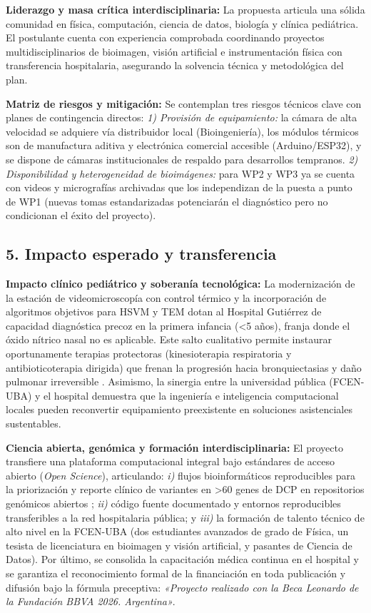 \documentclass[11pt,letterpaper]{article}
\begin{document}
\textbf{Liderazgo y masa crítica interdisciplinaria:} La propuesta articula una sólida comunidad en física, computación, ciencia de datos, biología y clínica pediátrica. El postulante cuenta con experiencia comprobada coordinando proyectos multidisciplinarios de bioimagen, visión artificial e instrumentación física con transferencia hospitalaria, asegurando la solvencia técnica y metodológica del plan.

\textbf{Matriz de riesgos y mitigación:} Se contemplan tres riesgos técnicos clave con planes de contingencia directos: \textit{1) Provisión de equipamiento:} la cámara de alta velocidad se adquiere vía distribuidor local (Bioingeniería), los módulos térmicos son de manufactura aditiva y electrónica comercial accesible (Arduino/ESP32), y se dispone de cámaras institucionales de respaldo para desarrollos tempranos. \textit{2) Disponibilidad y heterogeneidad de bioimágenes:} para WP2 y WP3 ya se cuenta con videos y micrografías archivadas que los independizan de la puesta a punto de WP1 (nuevas tomas estandarizadas potenciarán el diagnóstico pero no condicionan el éxito del proyecto).

\subsection*{5. Impacto esperado y transferencia}

\textbf{Impacto clínico pediátrico y soberanía tecnológica:} La modernización de la estación de videomicroscopía con control térmico y la incorporación de algoritmos objetivos para HSVM y TEM dotan al Hospital Gutiérrez de capacidad diagnóstica precoz en la primera infancia (<5 años), franja donde el óxido nítrico nasal no es aplicable. Este salto cualitativo permite instaurar oportunamente terapias protectoras (kinesioterapia respiratoria y antibioticoterapia dirigida) que frenan la progresión hacia bronquiectasias y daño pulmonar irreversible \cite{Robson2025,Shapiro2015,ComiteNeumonologia2020,Balinotti2026}. Asimismo, la sinergia entre la universidad pública (FCEN-UBA) y el hospital demuestra que la ingeniería e inteligencia computacional locales pueden reconvertir equipamiento preexistente en soluciones asistenciales sustentables.

\textbf{Ciencia abierta, genómica y formación interdisciplinaria:} El proyecto transfiere una plataforma computacional integral bajo estándares de acceso abierto (\textit{Open Science}), articulando: \textit{i)} flujos bioinformáticos reproducibles para la priorización y reporte clínico de variantes en >60 genes de DCP en repositorios genómicos abiertos \cite{Collison2025,Wrona2025}; \textit{ii)} código fuente documentado y entornos reproducibles transferibles a la red hospitalaria pública; y \textit{iii)} la formación de talento técnico de alto nivel en la FCEN-UBA (dos estudiantes avanzados de grado de Física, un tesista de licenciatura en bioimagen y visión artificial, y pasantes de Ciencia de Datos). Por último, se consolida la capacitación médica continua en el hospital y se garantiza el reconocimiento formal de la financiación en toda publicación y difusión bajo la fórmula preceptiva: \textit{«Proyecto realizado con la Beca Leonardo de la Fundación BBVA 2026. Argentina»}.
\end{document}
